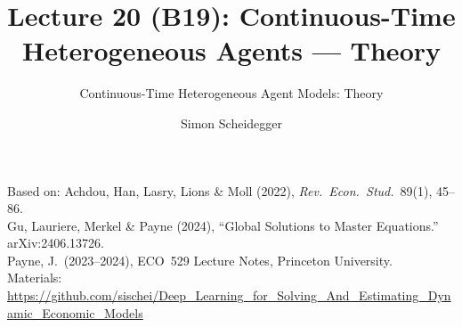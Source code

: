 \documentclass[aspectratio=169,11pt]{beamer}
\title[Lecture 20 (B19)]{Lecture 20 (B19): Continuous-Time Heterogeneous Agents --- Theory}
\subtitle{Continuous-Time Heterogeneous Agent Models: Theory}
\author{Simon Scheidegger}
\institute{HEC, University of Lausanne}
\date{}
\begin{document}
\newcommand{\exercisepause}{%
  \tikz[baseline=(X.base)]{\node[fill=darkgreen!80!black, text=white,
  rounded corners=2pt, inner sep=3pt, font=\scriptsize\bfseries](X){PAUSE --- 5 min};}}



{
\begin{frame}
\titlepage
\vspace{-0.4cm}
\begin{center}
{\footnotesize Based on: Achdou, Han, Lasry, Lions \& Moll (2022), \emph{Rev.\ Econ.\ Stud.}\ 89(1), 45--86.}\\[2pt]
{\footnotesize Gu, Lauriere, Merkel \& Payne (2024), ``Global Solutions to Master Equations.'' arXiv:2406.13726.}\\[2pt]
{\footnotesize Payne, J.\ (2023--2024), ECO~529 Lecture Notes, Princeton University.}\\[4pt]
{\footnotesize Materials: \url{https://github.com/sischei/Deep_Learning_for_Solving_And_Estimating_Dynamic_Economic_Models}}
\end{center}
\end{frame}
}
\end{document}
